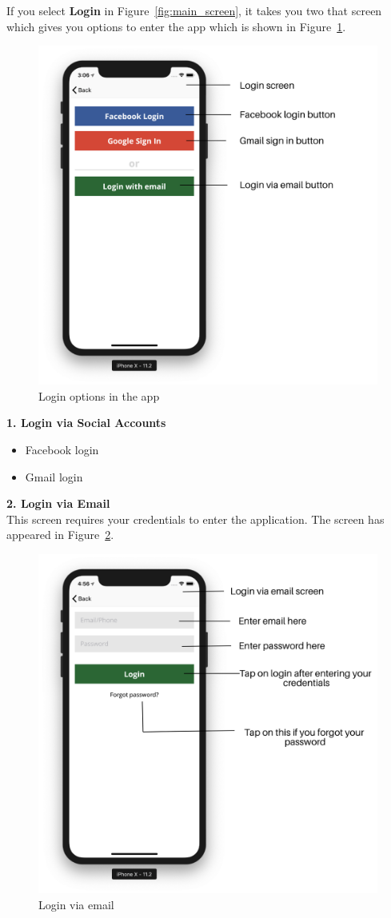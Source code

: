 \begin{itemize}
    
    If you select \textbf{Login} in Figure~\ref{fig:main_screen}, it takes you two that screen which gives you options to enter the app which is shown in Figure~\ref{fig:loginOptions}.
    
    \begin{figure}[H]
            \centering
            \includegraphics[width=0.50\linewidth]{figures/ch2/loginOptions.png}
            \caption{\label{fig:loginOptions} Login options in the app}
    \end{figure}
    
     \textbf{1. Login via Social Accounts}
     \begin{itemize}
         \item Facebook login
         \item Gmail login
     \end{itemize}
   
     \textbf{2. Login via Email} \\
    This screen requires your credentials to enter the application. The screen has appeared in Figure~\ref{fig:login_email}.
     
     \begin{figure}[H]
            \centering
            \includegraphics[width=0.50\linewidth]{figures/ch2/login_email.png}
            \caption{\label{fig:login_email} Login via email}
    \end{figure}
    

\end{itemize}
